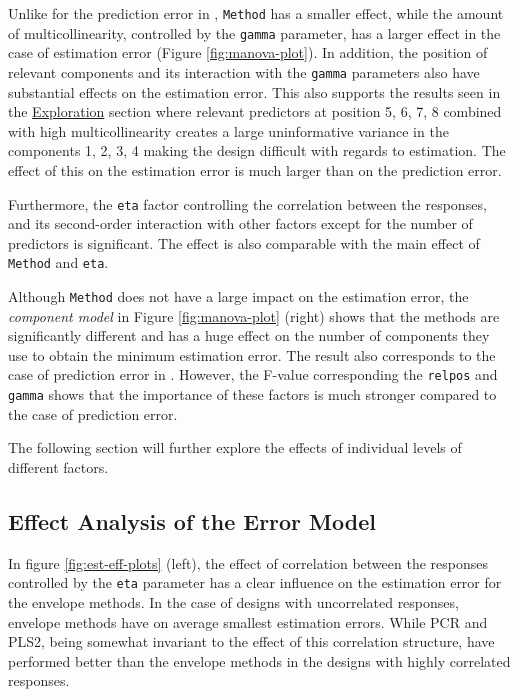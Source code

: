 \documentclass[12pt,3p,authoryear]{elsarticle}
\providecommand{\tightlist}{%
  \setlength{\itemsep}{0pt}\setlength{\parskip}{0pt}}
\begin{document}
\begin{description}
\tightlist
\item[\textbf{Error Model:}]
Unlike for the prediction error in \citet{rimal2019pred},
\texttt{Method} has a smaller effect, while the amount of
multicollinearity, controlled by the \texttt{gamma} parameter, has a
larger effect in the case of estimation error (Figure
\ref{fig:manova-plot}). In addition, the position of relevant components
and its interaction with the \texttt{gamma} parameters also have
substantial effects on the estimation error. This also supports the
results seen in the \protect\hyperlink{exploration}{Exploration} section
where relevant predictors at position 5, 6, 7, 8 combined with high
multicollinearity creates a large uninformative variance in the
components 1, 2, 3, 4 making the design difficult with regards to
estimation. The effect of this on the estimation error is much larger
than on the prediction error.

Furthermore, the \texttt{eta} factor controlling the correlation between
the responses, and its second-order interaction with other factors
except for the number of predictors is significant. The effect is also
comparable with the main effect of \texttt{Method} and \texttt{eta}.
\item[\textbf{Component Model:}]
Although \texttt{Method} does not have a large impact on the estimation
error, the \emph{component model} in Figure \ref{fig:manova-plot}
(right) shows that the methods are significantly different and has a
huge effect on the number of components they use to obtain the minimum
estimation error. The result also corresponds to the case of prediction
error in \citet{rimal2019pred}. However, the F-value corresponding the
\texttt{relpos} and \texttt{gamma} shows that the importance of these
factors is much stronger compared to the case of prediction error.
\end{description}

The following section will further explore the effects of individual
levels of different factors.

\subsection{Effect Analysis of the Error
Model}\label{effect-analysis-of-the-error-model}

In figure \ref{fig:est-eff-plots} (left), the effect of correlation
between the responses controlled by the \texttt{eta} parameter has a
clear influence on the estimation error for the envelope methods. In the
case of designs with uncorrelated responses, envelope methods have on
average smallest estimation errors. While PCR and PLS2, being somewhat
invariant to the effect of this correlation structure, have performed
better than the envelope methods in the designs with highly correlated
responses.
\end{document}
